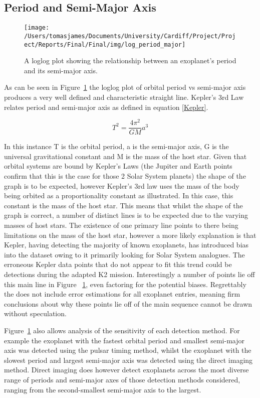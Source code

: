 \documentclass{report}
\begin{document}
\subsection*{Period and Semi-Major Axis}
\begin{figure}[H]
\centering
    \texttt{[image: /Users/tomasjames/Documents/University/Cardiff/Project/Project/Reports/Final/Final/img/log\_period\_major]}
\caption{A loglog plot showing the relationship between an exoplanet's period and its semi-major axis.}\label{log_period_major}
\end{figure}

As can be seen in Figure~\ref{log_period_major} the loglog plot of orbital period vs semi-major axis produces a very well defined and characteristic straight line. Kepler's 3rd Law relates period and semi-major axis as defined in equation \ref{Kepler}.

\begin{equation} \label{Kepler}
    T^{2} = \frac{4\pi^2}{GM} a^{3} 
\end{equation}

In this instance T is the orbital period, a is the semi-major axis, G is the universal gravitational constant and M is the mass of the host star. Given that orbital systems are bound by Kepler's Laws (the Jupiter and Earth points confirm that this is the case for those 2 Solar System planets) the shape of the graph is to be expected, however Kepler's 3rd law uses the mass of the body being orbited as a proportionality constant as illustrated. In this case, this constant is the mass of the host star. This means that whilst the shape of the graph is correct, a number of distinct lines is to be expected due to the varying masses of host stars. The existence of one primary line points to there being limitations on the mass of the host star, however a more likely explanation is that Kepler, having detecting the majority of known exoplanets, has introduced bias into the dataset owing to it primarily looking for Solar System analogues. The erroneous Kepler data points that do not appear to fit this trend could be detections during the adapted K2 mission. Interestingly a number of points lie off this main line in Figure ~\ref{log_period_major}, even factoring for the potential biases. Regrettably the \textcite{exo} does not include error estimations for all exoplanet entries, meaning firm conclusions about why these points lie off of the main sequence cannot be drawn without speculation.

Figure~\ref{log_period_major} also allows analysis of the sensitivity of each detection method. For example the exoplanet with the fastest orbital period and smallest semi-major axis was detected using the pulsar timing method, whilst the exoplanet with the slowest period and largest semi-major axis was detected using the direct imaging method. Direct imaging does however detect exoplanets across the most diverse range of periods and semi-major axes of those detection methods considered, ranging from the second-smallest semi-major axis to the largest.
\end{document}
